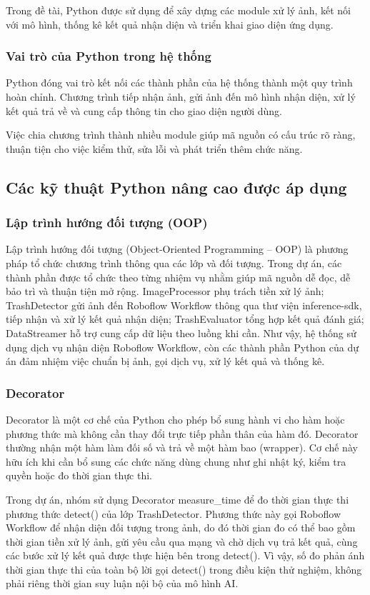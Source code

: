 \documentclass[a4paper,13pt]{extarticle}
\begin{document}
Trong đề tài, Python được sử dụng để xây dựng các module xử lý ảnh, kết nối với mô hình, thống kê kết quả nhận diện và triển khai giao diện ứng dụng.

\subsubsection{Vai trò của Python trong hệ thống}
Python đóng vai trò kết nối các thành phần của hệ thống thành một quy trình hoàn chỉnh. Chương trình tiếp nhận ảnh, gửi ảnh đến mô hình nhận diện, xử lý kết quả trả về và cung cấp thông tin cho giao diện người dùng.

Việc chia chương trình thành nhiều module giúp mã nguồn có cấu trúc rõ ràng, thuận tiện cho việc kiểm thử, sửa lỗi và phát triển thêm chức năng.

\subsection{Các kỹ thuật Python nâng cao được áp dụng}

\subsubsection{Lập trình hướng đối tượng (OOP)}
Lập trình hướng đối tượng (Object-Oriented Programming – OOP) là phương pháp tổ chức chương trình thông qua các lớp và đối tượng. Trong dự án, các thành phần được tổ chức theo từng nhiệm vụ nhằm giúp mã nguồn dễ đọc, dễ bảo trì và thuận tiện mở rộng. ImageProcessor phụ trách tiền xử lý ảnh; TrashDetector gửi ảnh đến Roboflow Workflow thông qua thư viện inference-sdk, tiếp nhận và xử lý kết quả nhận diện; TrashEvaluator tổng hợp kết quả đánh giá; DataStreamer hỗ trợ cung cấp dữ liệu theo luồng khi cần. Như vậy, hệ thống sử dụng dịch vụ nhận diện Roboflow Workflow, còn các thành phần Python của dự án đảm nhiệm việc chuẩn bị ảnh, gọi dịch vụ, xử lý kết quả và thống kê.

\subsubsection{Decorator}
Decorator là một cơ chế của Python cho phép bổ sung hành vi cho hàm hoặc phương thức mà không cần thay đổi trực tiếp phần thân của hàm đó. Decorator thường nhận một hàm làm đối số và trả về một hàm bao (wrapper). Cơ chế này hữu ích khi cần bổ sung các chức năng dùng chung như ghi nhật ký, kiểm tra quyền hoặc đo thời gian thực thi.

Trong dự án, nhóm sử dụng Decorator measure\_time để đo thời gian thực thi phương thức detect() của lớp TrashDetector. Phương thức này gọi Roboflow Workflow để nhận diện đối tượng trong ảnh, do đó thời gian đo có thể bao gồm thời gian tiền xử lý ảnh, gửi yêu cầu qua mạng và chờ dịch vụ trả kết quả, cùng các bước xử lý kết quả được thực hiện bên trong detect(). Vì vậy, số đo phản ánh thời gian thực thi của toàn bộ lời gọi detect() trong điều kiện thử nghiệm, không phải riêng thời gian suy luận nội bộ của mô hình AI.
\end{document}
